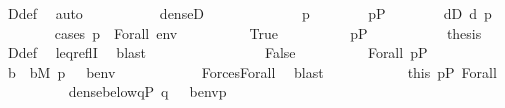 \begin{isabellebody}
\ D{\isacharunderscore}{\kern0pt}def\ \isamarkupfalse%
\ auto\isanewline
\ \ \ \ \isamarkupfalse%
\isanewline
\ \ \ \ \isamarkupfalse%
\ {\isachardoublequoteopen}dense{\isacharparenleft}{\kern0pt}D{\isacharparenright}{\kern0pt}{\isachardoublequoteclose}\ \isanewline
\ \ \ \ \isamarkupfalse%
\isanewline
\ \ \ \ \ \ \isamarkupfalse%
\ p\isanewline
\ \ \ \ \ \ \isamarkupfalse%
\ {\isachardoublequoteopen}p{\isasymin}P{\isachardoublequoteclose}\isanewline
\ \ \ \ \ \ \isamarkupfalse%
\ {\isachardoublequoteopen}{\isasymexists}d{\isasymin}D{\isachardot}{\kern0pt}\ d{\isasympreceq}\ p{\isachardoublequoteclose}\isanewline
\ \ \ \ \ \ \isamarkupfalse%
\ {\isacharparenleft}{\kern0pt}cases\ {\isachardoublequoteopen}p\ {\isasymtturnstile}\ Forall{\isacharparenleft}{\kern0pt}{\isasymphi}{\isacharparenright}{\kern0pt}\ env{\isachardoublequoteclose}{\isacharparenright}{\kern0pt}\isanewline
\ \ \ \ \ \ \ \ \isamarkupfalse%
\ True\isanewline
\ \ \ \ \ \ \ \ \isamarkupfalse%
\ {\isacartoucheopen}p{\isasymin}P{\isacartoucheclose}\ \isanewline
\ \ \ \ \ \ \ \ \isamarkupfalse%
\ {\isacharquery}{\kern0pt}thesis\ \isamarkupfalse%
\ D{\isacharunderscore}{\kern0pt}def\ \isamarkupfalse%
\ leq{\isacharunderscore}{\kern0pt}reflI\ \isamarkupfalse%
\ blast\isanewline
\ \ \ \ \ \ \isamarkupfalse%
\isanewline
\ \ \ \ \ \ \ \ \isamarkupfalse%
\ False\isanewline
\ \ \ \ \ \ \ \ \isamarkupfalse%
\ Forall\ {\isacartoucheopen}p{\isasymin}P{\isacartoucheclose}\isanewline
\ \ \ \ \ \ \ \ \isamarkupfalse%
\ b\ \ {\isachardoublequoteopen}b{\isasymin}M{\isachardoublequoteclose}\ {\isachardoublequoteopen}{\isasymnot}{\isacharparenleft}{\kern0pt}p\ {\isasymtturnstile}\ {\isasymphi}\ {\isacharparenleft}{\kern0pt}{\isacharbrackleft}{\kern0pt}b{\isacharbrackright}{\kern0pt}{\isacharat}{\kern0pt}env{\isacharparenright}{\kern0pt}{\isacharparenright}{\kern0pt}{\isachardoublequoteclose}\isanewline
\ \ \ \ \ \ \ \ \ \ \isamarkupfalse%
\ Forces{\isacharunderscore}{\kern0pt}Forall\ \isamarkupfalse%
\ blast\isanewline
\ \ \ \ \ \ \ \ \isamarkupfalse%
\ \isamarkupfalse%
\ this\ {\isacartoucheopen}p{\isasymin}P{\isacartoucheclose}\ Forall\isanewline
\ \ \ \ \ \ \ \ \isamarkupfalse%
\ {\isachardoublequoteopen}{\isasymnot}dense{\isacharunderscore}{\kern0pt}below{\isacharparenleft}{\kern0pt}{\isacharbraceleft}{\kern0pt}q{\isasymin}P{\isachardot}{\kern0pt}\ q\ {\isasymtturnstile}\ {\isasymphi}\ {\isacharparenleft}{\kern0pt}{\isacharbrackleft}{\kern0pt}b{\isacharbrackright}{\kern0pt}{\isacharat}{\kern0pt}env{\isacharparenright}{\kern0pt}{\isacharbraceright}{\kern0pt}{\isacharcomma}{\kern0pt}p{\isacharparenright}{\kern0pt}{\isachardoublequoteclose}\isanewline

\end{isabellebody}
